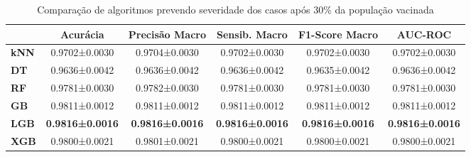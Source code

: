 \begin{table}[H]
  \footnotesize
  \centering
  \begin{tabular}{l|c|c|c|c|c|}
    \cline{2-6}
    \multicolumn{1}{c|}{\textbf{}}     & \textbf{Acurácia}      & \textbf{Precisão Macro} & \textbf{Sensib. Macro} & \textbf{F1-Score Macro} & \textbf{AUC-ROC}       \\ \hline
    \multicolumn{1}{|l|}{\textbf{kNN}} & 0.9702±0.0030          & 0.9704±0.0030           & 0.9702±0.0030          & 0.9702±0.0030           & 0.9702±0.0030          \\ \hline
    \multicolumn{1}{|l|}{\textbf{DT}}  & 0.9636±0.0042          & 0.9636±0.0042           & 0.9636±0.0042          & 0.9635±0.0042           & 0.9636±0.0042          \\ \hline
    \multicolumn{1}{|l|}{\textbf{RF}}  & 0.9781±0.0030          & 0.9782±0.0030           & 0.9781±0.0030          & 0.9781±0.0030           & 0.9781±0.0030          \\ \hline
    \multicolumn{1}{|l|}{\textbf{GB}}  & 0.9811±0.0012          & 0.9811±0.0012           & 0.9811±0.0012          & 0.9811±0.0012           & 0.9811±0.0012          \\ \hline
    \multicolumn{1}{|l|}{\textbf{LGB}} & \textbf{0.9816±0.0016} & \textbf{0.9816±0.0016}  & \textbf{0.9816±0.0016} & \textbf{0.9816±0.0016}  & \textbf{0.9816±0.0016} \\ \hline
    \multicolumn{1}{|l|}{\textbf{XGB}} & 0.9800±0.0021          & 0.9801±0.0021           & 0.9800±0.0021          & 0.9800±0.0021           & 0.9800±0.0021          \\ \hline
    \end{tabular}
\caption{Comparação de algoritmos prevendo severidade dos casos após 30\% da população vacinada}
\label{tab:comparacao-vacinacao-30}
\end{table}

